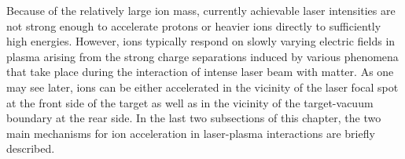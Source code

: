 Because of the relatively large ion mass, currently achievable laser intensities are not strong enough to accelerate protons or heavier ions directly to sufficiently high energies. However, ions typically respond on slowly varying electric fields in plasma arising from the strong charge separations induced by various phenomena that take place during the interaction of intense laser beam with matter. As one may see later, ions can be either accelerated in the vicinity of the laser focal spot at the front side of the target as well as in the vicinity of the target-vacuum boundary at the rear side. In the last two subsections of this chapter, the two main mechanisms for ion acceleration in laser-plasma interactions are briefly described.